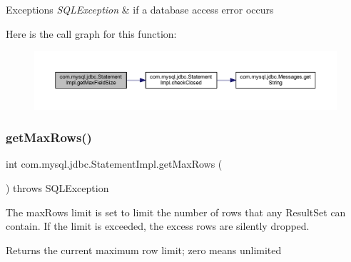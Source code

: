 \begin{DoxyExceptions}{Exceptions}
{\em S\+Q\+L\+Exception} & if a database access error occurs \\
\hline
\end{DoxyExceptions}
Here is the call graph for this function\+:
\nopagebreak
\begin{figure}[H]
\begin{center}
\leavevmode
\includegraphics[width=350pt]{classcom_1_1mysql_1_1jdbc_1_1_statement_impl_a066cb00e850efd48fd78d5f717fd0626_cgraph}
\end{center}
\end{figure}
\mbox{\label{classcom_1_1mysql_1_1jdbc_1_1_statement_impl_a5961bd894f79a6b3e2dedc7726527aab}} 
\subsubsection{\texorpdfstring{get\+Max\+Rows()}{getMaxRows()}}
{\footnotesize\ttfamily int com.\+mysql.\+jdbc.\+Statement\+Impl.\+get\+Max\+Rows (\begin{DoxyParamCaption}{ }\end{DoxyParamCaption}) throws S\+Q\+L\+Exception}

The max\+Rows limit is set to limit the number of rows that any Result\+Set can contain. If the limit is exceeded, the excess rows are silently dropped.

\begin{DoxyReturn}{Returns}
the current maximum row limit; zero means unlimited
\end{DoxyReturn}

